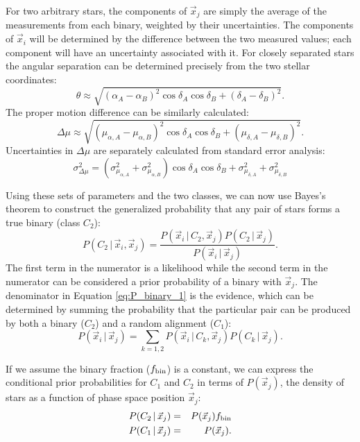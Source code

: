 \documentclass[usenatbib]{mnras}
\newcommand{\given}{\,|\,}
\begin{document}
For two arbitrary stars, the components of $\vec{x}_j$ are simply the average of the measurements from each binary, weighted by their uncertainties. The components of $\vec{x}_i$ will be determined by the difference between the two measured values; each component will have an uncertainty associated with it. For closely separated stars the angular separation can be determined precisely from the two stellar coordinates:
\begin{equation}
\theta \approx \sqrt{(\alpha_A - \alpha_B)^2 \cos \delta_A \cos \delta_B
			 + (\delta_A - \delta_B)^2}.
\end{equation}
The proper motion difference can be similarly calculated:
\begin{equation}
\Delta \mu \approx \sqrt{(\mu_{\alpha, A} - \mu_{\alpha, B})^2 
			\cos \delta_A \cos \delta_B 
			+ (\mu_{\delta, A} - \mu_{\delta, B})^2}.
\end{equation}
Uncertainties in $\Delta \mu$ are separately calculated from standard error analysis:
\begin{equation}
\sigma_{\Delta \mu}^2 = \left( \sigma_{\mu_{\alpha, A}}^2 + \sigma_{\mu_{\alpha, B}}^2 \right) \cos \delta_A \cos \delta_B + \sigma_{\mu_{\delta, A}}^2 + \sigma_{\mu_{\delta, B}}^2  
\end{equation}



Using these sets of parameters and the two classes, we can now use Bayes's theorem to construct the generalized probability that any pair of stars forms a true binary (class $C_2$):
\begin{equation}
P(C_2 \given \vec{x}_i, \vec{x}_j) = \frac{P(\vec{x}_i \given C_2, \vec{x}_j) P(C_2 \given \vec{x}_j)}{P(
\vec{x}_i \given \vec{x}_j)}. \label{eq:P_binary_1}
\end{equation}
The first term in the numerator is a likelihood while the second term in the numerator can be considered a prior probability of a binary with $\vec{x}_j$. The denominator in Equation \ref{eq:P_binary_1} is the evidence, which can be determined by summing the probability that the particular pair can be produced by both a binary ($C_2$) and a random alignment ($C_1$):
\begin{equation}
P(\vec{x}_i \given \vec{x}_j) = \sum_{k=1,2} P(\vec{x}_i \given C_k, \vec{x}_j) P(C_k \given \vec{x}_j).
\end{equation}


If we assume the binary fraction ($f_{\rm bin}$) is a constant, we can express the conditional prior probabilities for $C_1$ and $C_2$ in terms of $P(\vec{x}_j)$, the density of stars as a function of phase space position $\vec{x}_j$:
\begin{eqnarray}
P(C_2 \given \vec{x}_j) &=& P(\vec{x}_j) f_{\rm bin} \\
P(C_1 \given \vec{x}_j) &=& P(\vec{x}_j).
\end{eqnarray}
\end{document}
